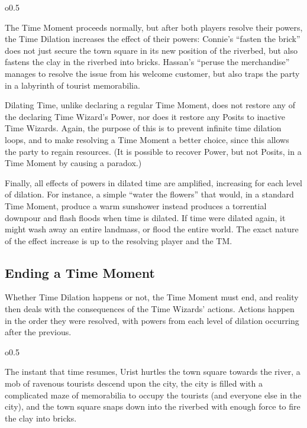 \documentclass[twoside]{article}
\newenvironment{examplebox}[1]{\begin{tcolorbox}[colback=green!5!white,colframe=green!75!black,title={Example: #1}]}{\end{tcolorbox}\vspace{-30pt}}
\begin{document}
\begin{wrapfigure}{o}{0.5\textwidth}
   \vspace{-10pt}
   \begin{examplebox}{Power Amplification}
      The Time Moment proceeds normally, but after both players resolve their powers, the
      Time Dilation increases the effect of their powers: Connie's ``fasten the brick'' does not
      just secure the town square in its new position of the riverbed, but also fastens the clay
      in the riverbed into bricks. Hassan's ``peruse the merchandise'' manages to resolve the
      issue from his welcome customer, but also traps the party in a labyrinth of tourist
      memorabilia.
   \end{examplebox}
   \vspace{20pt}
\end{wrapfigure}

Dilating Time, unlike declaring a regular Time Moment, does not restore any of the declaring
Time Wizard's Power, nor does it restore any Posits to inactive Time Wizards. Again, the purpose
of this is to prevent infinite time dilation loops, and to make resolving a Time Moment a better
choice, since this allows the party to regain resources. (It is possible to recover Power, but
not Posits, in a Time Moment by causing a paradox.)

Finally, all effects of powers in dilated time are amplified, increasing for each level of
dilation. For instance, a simple ``water the flowers'' that would, in a standard Time Moment,
produce a warm sunshower instead produces a torrential downpour and flash floods when time is
dilated. If time were dilated again, it might wash away an entire landmass, or flood the entire
world. The exact nature of the effect increase is up to the resolving player and the TM.

\subsection{Ending a Time Moment} \label{ssec:end-moment}
Whether Time Dilation happens or not, the Time Moment must end, and reality then deals with the
consequences of the Time Wizards' actions. Actions happen in the order they were resolved, with
powers from each level of dilation occurring after the previous.

\begin{wrapfigure}{o}{0.5\textwidth}
   \vspace{-10pt}
   \begin{examplebox}{Time Resumes}
      The instant that time resumes, Urist hurtles the town square towards the river, a mob of
      ravenous tourists descend upon the city, the city is filled with a complicated maze of
      memorabilia to occupy the tourists (and everyone else in the city), and the town square
      snaps down into the riverbed with enough force to fire the clay into bricks.
   \end{examplebox}
   \vspace{20pt}
\end{wrapfigure}
\end{document}
